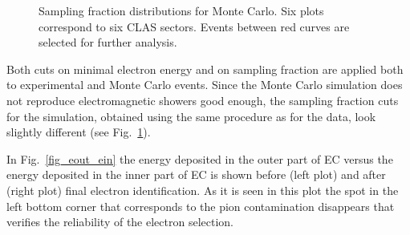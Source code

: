 \begin{figure}[htp]
\begin{center}
\caption{\small  Sampling fraction distributions for Monte Carlo. Six plots correspond to six CLAS sectors. Events between red curves are selected for further analysis.} \label{fig:ec_cut_sim}
\end{center}
\end{figure}

Both cuts on minimal electron energy and on sampling fraction are applied
both to experimental and Monte Carlo events. Since the Monte Carlo simulation does not reproduce electromagnetic showers good enough, the sampling fraction cuts for the simulation, obtained using the same procedure as for the data, look slightly different (see Fig.~\ref{fig:ec_cut_sim}).

In Fig.~\ref{fig_eout_ein} the energy deposited in the outer part of EC versus the energy deposited in the inner part of EC is shown before (left plot) and after (right plot) final electron identification. As it is seen in this plot the spot in the left bottom corner that corresponds to the pion contamination disappears that verifies the reliability of the electron selection.

